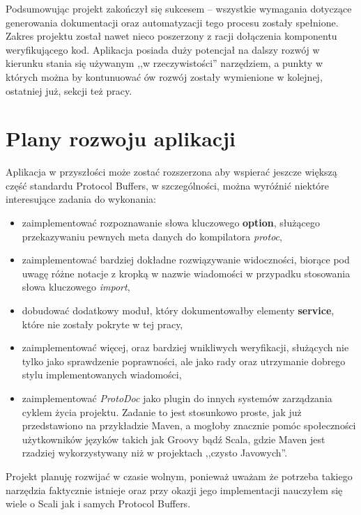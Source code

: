 \documentclass[pdflatex,11pt]{aghdpl}
\begin{document}
Podsumowując projekt zakończył się sukcesem -- wszystkie wymagania dotyczące generowania dokumentacji oraz automatyzacji tego procesu zostały spełnione.
Zakres projektu został nawet nieco poszerzony z racji dołączenia komponentu weryfikującego kod. Aplikacja posiada duży potencjał na dalszy rozwój
w kierunku stania się używanym ,,w rzeczywistości'' narzędziem, a punkty w których można by kontunuować ów rozwój zostały wymienione w kolejnej, ostatniej już, sekcji też pracy.

\section{Plany rozwoju aplikacji}
Aplikacja w przyszłości może zostać rozszerzona aby wspierać jeszcze większą część standardu 
Protocol Buffers, w szczególności, można wyróźnić niektóre interesujące zadania do wykonania:

\begin{itemize}
 \item zaimplementować rozpoznawanie słowa kluczowego \textbf{option}, służącego przekazywaniu pewnych meta danych do kompilatora \textit{protoc},
 \item zaimplementować bardziej dokładne rozwiązywanie widoczności, biorące pod uwagę różne notacje z kropką w nazwie wiadomości
       w przypadku stosowania słowa kluczowego \textit{import},
 \item dobudować dodatkowy moduł, który dokumentowałby elementy \textbf{service}, które nie zostały pokryte w tej pracy,
 \item zaimplementować więcej, oraz bardziej wnikliwych weryfikacji, służących nie tylko jako sprawdzenie poprawności, ale jako rady oraz utrzymanie dobrego stylu
       implementowanych wiadomości,
 \item zaimplementować \textit{ProtoDoc} jako plugin do innych systemów zarządzania cyklem życia projektu. Zadanie to jest stosunkowo proste, 
       jak już przedstawiono na przykładzie Maven, a mogłoby znacznie pomóc społeczności użytkowników języków takich jak Groovy bądź Scala, gdzie Maven 
       jest rzadziej wykorzystywany niż w projektach ,,czysto Javowych''.
\end{itemize}

Projekt planuję rozwijać w czasie wolnym, ponieważ uważam że potrzeba takiego narzędzia faktycznie istnieje oraz przy okazji jego 
implementacji nauczyłem się wiele o Scali jak i samych Protocol Buffers.


\appendix





\end{document}

